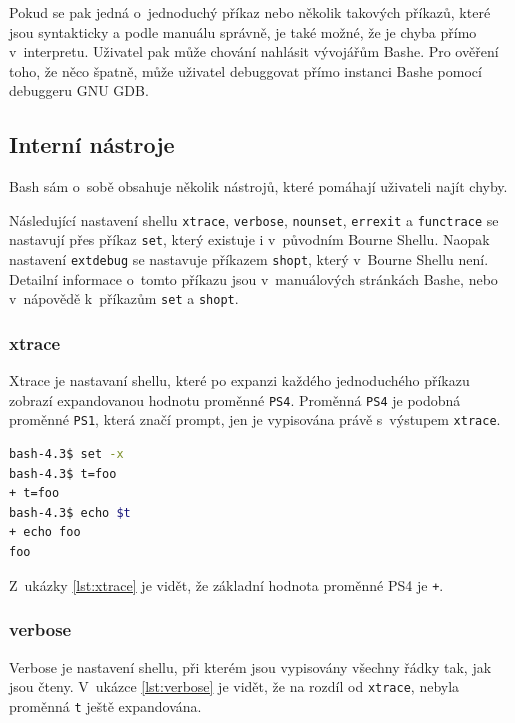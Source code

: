 \documentclass[thesis=M,czech]{FITthesis}[2012/06/26]
\begin{document}
Pokud se pak jedná o~jednoduchý příkaz nebo několik takových příkazů, které jsou syntakticky a podle manuálu správně, je také možné, že je chyba přímo v~interpretu. Uživatel pak může chování nahlásit vývojářům Bashe. Pro ověření toho, že něco špatně, může uživatel debuggovat přímo instanci Bashe pomocí debuggeru GNU GDB.



%
\subsection{Interní nástroje}

Bash sám o~sobě obsahuje několik nástrojů, které pomáhají uživateli najít chyby.

Následující nastavení shellu \texttt{xtrace}, \texttt{verbose}, \texttt{nounset}, \texttt{errexit} a \texttt{functrace} se nastavují přes příkaz \texttt{set}, který existuje i v~původním Bourne Shellu. Naopak nastavení \texttt{extdebug} se nastavuje příkazem \texttt{shopt}, který v~Bourne Shellu není. Detailní informace o~tomto příkazu jsou v~manuálových stránkách Bashe, nebo v~nápovědě k~příkazům \texttt{set} a \texttt{shopt}.

\subsubsection{xtrace}

Xtrace je nastavaní shellu, které po expanzi každého jednoduchého příkazu zobrazí expandovanou hodnotu proměnné \texttt{PS4}. Proměnná \texttt{PS4} je podobná proměnné \texttt{PS1}, která značí prompt, jen je vypisována právě s~výstupem \texttt{xtrace}.

\noindent
\begin{minipage}{\linewidth}
\begin{lstlisting}[language=bash, caption={Nastavení xtrace}, label={lst:xtrace}]
bash-4.3$ set -x
bash-4.3$ t=foo
+ t=foo
bash-4.3$ echo $t
+ echo foo
foo
\end{lstlisting}
\end{minipage}

Z~ukázky \ref{lst:xtrace} je vidět, že základní hodnota proměnné PS4 je \texttt{+}.

\subsubsection{verbose}

Verbose je nastavení shellu, při kterém jsou vypisovány všechny řádky tak, jak jsou čteny. V~ukázce \ref{lst:verbose} je vidět, že na rozdíl od \texttt{xtrace}, nebyla proměnná \texttt{t} ještě expandována.
\end{document}
